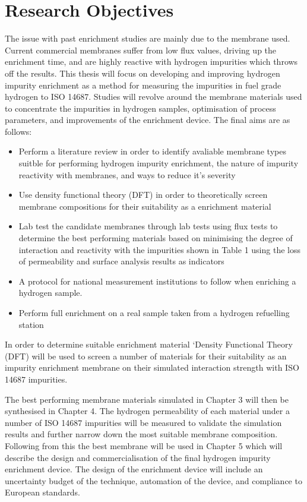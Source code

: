 \section{Research Objectives}
The issue with past enrichment studies are mainly due to the membrane used. Current commercial membranes suffer from low flux values, driving up the enrichment time, and are highly reactive with hydrogen impurities which throws off the results. This thesis will focus on developing and improving hydrogen impurity enrichment as a method for measuring the impurities in fuel grade hydrogen to ISO 14687. Studies will revolve around the membrane materials used to concentrate the impurities in hydrogen samples, optimisation of process parameters, and improvements of the enrichment device. The final aims are as follows:
\begin{itemize}
\item Perform a literature review in order to identify avaliable membrane types suitble for performing hydrogen impurity enrichment, the nature of impurity reactivity with membranes, and ways to reduce it's severity
\item Use density functional theory (DFT) in order to theoretically screen membrane compositions for their suitability as a enrichment material
\item Lab test the candidate membranes through lab tests using flux tests to determine the best performing materials based on minimising the degree of interaction and reactivity with the impurities shown in Table 1 using the loss of permeability and surface analysis results as indicators
\item A protocol for national measurement institutions to follow when enriching a hydrogen sample. 
\item Perform full enrichment on a real sample taken from a hydrogen refuelling station
\end{itemize}
In order to determine suitable enrichment material ‘Density Functional Theory (DFT) will be used to screen a number of materials for their suitability as an impurity enrichment membrane on their simulated 
interaction strength with ISO 14687 impurities. 

The best performing membrane materials simulated in Chapter 3 will then be synthesised in Chapter 4. 
The hydrogen permeability of each material under a number of ISO 14687 impurities will be measured to 
validate the simulation results and further narrow down the most suitable membrane composition. 
Following from this the best membrane will be used in Chapter 5 which will describe the design and 
commercialisation of the final hydrogen impurity enrichment device. The design of the enrichment device 
will include an uncertainty budget of the technique, automation of the device, and compliance to European standards.

